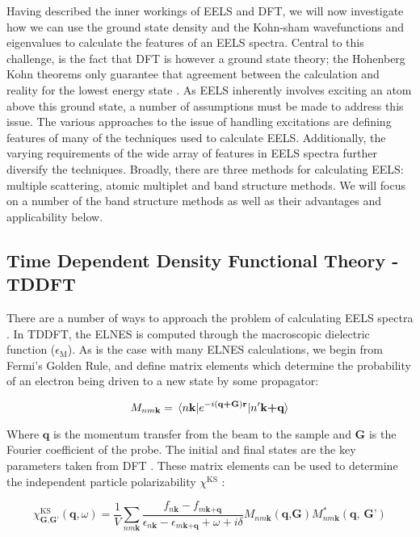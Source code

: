 
Having described the inner workings of EELS and DFT, we will now investigate how we can use the ground state density and the Kohn-sham wavefunctions and eigenvalues to calculate the features of an EELS spectra.  Central to this challenge, is the fact that DFT is however a ground state theory; the Hohenberg Kohn theorems only guarantee that agreement between the calculation and reality for the lowest energy state \cite{hohenberg_inhomogeneous_1964}. As EELS inherently involves exciting an atom above this ground state, a number of assumptions must be made to address this issue. The various approaches to the issue of handling excitations are defining features of many of the techniques used to calculate EELS.  Additionally, the varying requirements of the wide array of features in EELS spectra further diversify the techniques. Broadly, there are three methods for calculating EELS: multiple scattering, atomic multiplet and band structure methods.  We will focus on a number of the band structure methods as well as their advantages and applicability below.


\subsection{Time Dependent Density Functional Theory -TDDFT}
There are a number of ways to approach the problem of calculating EELS spectra \cite {optic, adler_quantum_1962}. In TDDFT, the ELNES is computed through the macroscopic dielectric function ($\epsilon_{\mathrm{M}}$). As is the case with many ELNES calculations, we begin from Fermi's Golden Rule, and define matrix elements which determine the probability of an electron being driven to a new state by some propagator:

\begin{equation}
M_{nm\textbf{k}} = \mel{n\textbf{k}}{e^{-i(\textbf{q+G})\textbf{r}}}{n'\textbf{k+q}}
\label{FGR}
\end{equation}

Where $\textbf{q}$ is the momentum transfer from the beam to the sample and \textbf{G} is the Fourier coefficient of the probe. The initial and final states are the key parameters taken from DFT \cite{exciting}.  These matrix elements can be used to determine the independent particle polarizability $\chi^{\mathrm{KS}}$ \cite{exciting}: 


\begin{equation}
\chi^{\mathrm{KS}}_{\mathrm{\textbf{G,G'}}}(\textbf{q},\omega)=\frac{1}{V}\sum_{nm\textbf{k}}\frac{f_{n\textbf{k}}-f_{m\textbf{k+q}}}{\epsilon_{n\textbf{k}}-\epsilon_{m\textbf{k+q}}+\omega + i\delta} M_{nm\textbf{k}}(\textbf{q,G})M^*_{nm\textbf{k}}(\textbf{q, G'})
\end{equation}

